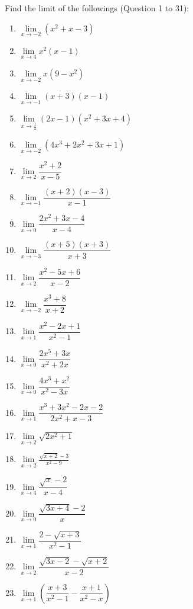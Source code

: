 \documentclass[12pt]{report}
\begin{document}
\setlength{\columnseprule}{1pt}
\setlength{\columnsep}{24pt}
\begin{multicols}{2}
  Find the limit of the followings (Question 1 to 31):

  \begin{enumerate}
    \item $\lim\limits_{x\to-2}\left(x^{2}+x-3\right)$
    \item $\lim\limits_{x\to4}x^{2}(x-1)$
    \item $\lim\limits_{x\to-2}x\left(9-x^{2}\right)$
    \item $\lim\limits_{x\to-1}(x+3)\left(x-1\right)$
    \item $\lim\limits_{x\to{\frac{1}{2}}}\left(2x-1\right)\left(x^{2}+3x+4\right)$
    \item $\lim\limits_{x\to-2}\left(4x^{3}+2x^{2}+3x+1\right)$
    \item $\lim\limits_{x\to2}{\dfrac{x^{2}+2}{x-5}}$
    \item $\lim\limits_{x\to-1}{\dfrac{(x+2)(x-3)}{x-1}}$
    \item $\lim\limits_{x\to0}{\dfrac{2x^{2}+3x-4}{x-4}}$
    \item $\lim\limits_{x\to-3}\dfrac{(x+5)(x+3)}{x+3}$
    \item $\lim\limits_{x\to2}{\dfrac{x^{2}-5x+6}{x-2}}$
    \item $\lim\limits_{x\to-2}{\dfrac{x^{3}+8}{x+2}}$
    \item $\lim\limits_{x\to1}{\dfrac{x^{2}-2x+1}{x^{2}-1}}$
    \item $\lim\limits_{x\to0}{\dfrac{2x^{5}+3x}{x^{2}+2x}}$
    \item $\lim\limits_{x\to0}{\dfrac{4x^{3}+x^{2}}{x^{2}-3x}}$
    \item $\lim\limits_{x\to1}{\dfrac{x^{3}+3x^{2}-2x-2}{2x^{2}+x-3}}$
    \item $\lim\limits_{x\to2}{\sqrt{2x^{2}+1}}$
    \item $\lim\limits_{x\to2}{\frac{{\sqrt{x+2}}-3}{x^{2}-9}}$
    \item $\lim\limits_{x\to4}{\dfrac{{\sqrt{x}}-2}{x-4}}$
    \item $\lim\limits_{x\to0}{\dfrac{\sqrt{3x+4}-2}{x}}$
    \item $\lim\limits_{x\to1}{\dfrac{2-{\sqrt{x+3}}}{x^{2}-1}}$
    \item $\lim\limits_{x\to2}{\dfrac{{\sqrt{3x-2}}-{\sqrt{x+2}}}{x-2}}$
    \item $\lim\limits_{x\to1}\left({\dfrac{x+3}{x^{2}-1}}-{\dfrac{x+1}{x^{2}-x}}\right)$

\end{enumerate}
\end{multicols}
\end{document}
